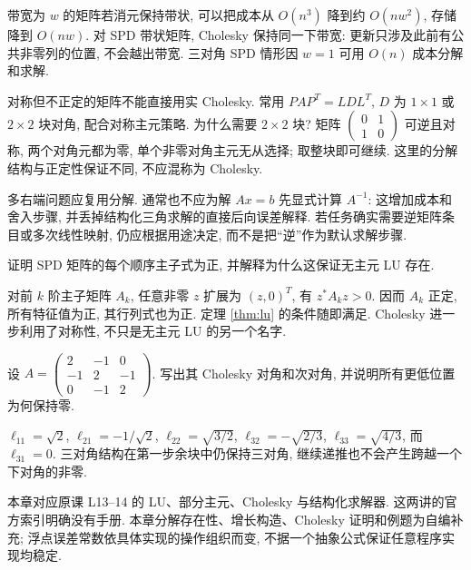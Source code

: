 带宽为 $w$ 的矩阵若消元保持带状, 可以把成本从 $O(n^3)$ 降到约 $O(nw^2)$, 存储降到 $O(nw)$. 对 SPD 带状矩阵, Cholesky 保持同一下带宽: 更新只涉及此前有公共非零列的位置, 不会越出带宽. 三对角 SPD 情形因 $w=1$ 可用 $O(n)$ 成本分解和求解.

对称但不正定的矩阵不能直接用实 Cholesky. 常用 $PAP^T=LDL^T$, $D$ 为 $1\times1$ 或 $2\times2$ 块对角, 配合对称主元策略. 为什么需要 $2\times2$ 块? 矩阵 $\begin{pmatrix}0&1\\1&0\end{pmatrix}$ 可逆且对称, 两个对角元都为零, 单个非零对角主元无从选择; 取整块即可继续. 这里的分解结构与正定性保证不同, 不应混称为 Cholesky.

多右端问题应复用分解. 通常也不应为解 $Ax=b$ 先显式计算 $A^{-1}$: 这增加成本和舍入步骤, 并丢掉结构化三角求解的直接后向误差解释. 若任务确实需要逆矩阵条目或多次线性映射, 仍应根据用途决定, 而不是把“逆”作为默认求解步骤.

\begin{exercise}
证明 SPD 矩阵的每个顺序主子式为正, 并解释为什么这保证无主元 LU 存在.
\end{exercise}
\begin{solution}
对前 $k$ 阶主子矩阵 $A_k$, 任意非零 $z$ 扩展为 $(z,0)^T$, 有 $z^*A_kz>0$. 因而 $A_k$ 正定, 所有特征值为正, 其行列式也为正. 定理 \ref{thm:lu} 的条件随即满足. Cholesky 进一步利用了对称性, 不只是无主元 LU 的另一个名字.
\end{solution}
\begin{exercise}
设 $A=\begin{pmatrix}2&-1&0\\-1&2&-1\\0&-1&2\end{pmatrix}$. 写出其 Cholesky 对角和次对角, 并说明所有更低位置为何保持零.
\end{exercise}
\begin{solution}
$\ell_{11}=\sqrt2$, $\ell_{21}=-1/\sqrt2$, $\ell_{22}=\sqrt{3/2}$, $\ell_{32}=-\sqrt{2/3}$, $\ell_{33}=\sqrt{4/3}$, 而 $\ell_{31}=0$. 三对角结构在第一步余块中仍保持三对角, 继续递推也不会产生跨越一个下对角的非零.
\end{solution}
\begin{remark}
本章对应原课 L13--14 的 LU、部分主元、Cholesky 与结构化求解器. 这两讲的官方索引明确没有手册. 本章分解存在性、增长构造、Cholesky 证明和例题为自编补充; 浮点误差常数依具体实现的操作组织而变, 不据一个抽象公式保证任意程序实现均稳定.
\end{remark}
